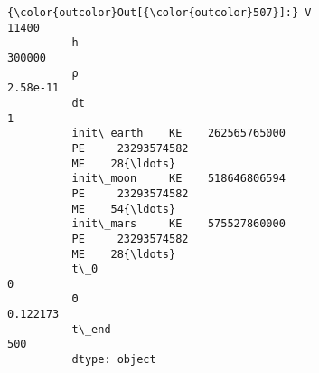 \documentclass[11pt]{article}
\begin{document}
\begin{Verbatim}[commandchars=\\\{\}]
{\color{outcolor}Out[{\color{outcolor}507}]:} V                                                         11400
          h                                                        300000
          ρ                                                      2.58e-11
          dt                                                            1
          init\_earth    KE    262565765000
          PE     23293574582
          ME    28{\ldots}
          init\_moon     KE    518646806594
          PE     23293574582
          ME    54{\ldots}
          init\_mars     KE    575527860000
          PE     23293574582
          ME    28{\ldots}
          t\_0                                                           0
          Θ                                                      0.122173
          t\_end                                                       500
          dtype: object
\end{Verbatim}
            
\end{document}
